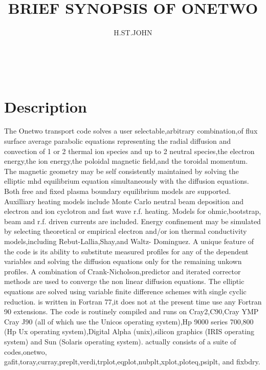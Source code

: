 \documentclass[12pt]{article}
\begin{document}
   \title{BRIEF SYNOPSIS OF ONETWO}
   \author{H.ST.JOHN}
   \date{   }   %
   \maketitle


       \boldmath\


      \section{Description}
    The Onetwo transport code solves a user selectable,arbitrary
 combination,of flux surface average parabolic equations representing
 the radial diffusion and convection of 1 or 2 thermal ion species and
 up to 2 neutral species,the electron energy,the ion energy,the poloidal
 magnetic field,and the toroidal momentum.  The magnetic geometry may be
 self consistently maintained by solving the elliptic mhd equilibrium
 equation simultaneously with the diffusion equations.  Both free and
 fixed plasma boundary equilibrium models are supported. Auxilliary
 heating models include Monte Carlo neutral beam deposition and electron
 and ion cyclotron and fast wave r.f. heating.  Models for ohmic,bootstrap,
 beam and r.f. driven currents are included.  Energy confinement may be
 simulated by selecting theoretical or empirical electron and/or ion
 thermal conductivity models,including Rebut-Lallia,Shay,and Waltz-
 Dominguez.  A unique feature of the code is its ability to substitute
 measured profiles for any of the dependent variables and solving the
 diffusion equations only for the remaining unkown profiles. A combination
 of Crank-Nicholson,predictor and iterated corrector methods are used to
 converge the non linear diffusion equations. The elliptic equations are
 solved using variable finite difference schemes with single cyclic
 reduction. 
    \ot is written in Fortran 77,it does not at the present time use
 any Fortran 90 extensions. The code is routinely compiled and runs on
 Cray2,C90,Cray YMP Cray J90 (all of which use the Unicos operating
 system),Hp 9000 series 700,800 (Hp Ux operating system),Digital
 Alpha (unix),silicon graphics (IRIS operating system) and Sun (Solaris
 operating system). \ot actually consists of a suite of codes,onetwo,
 gafit,toray,curray,preplt,verdi,trplot,eqplot,nubplt,xplot,ploteq,psiplt,
 and fixbdry. 
 
\end{document}
